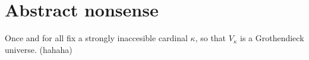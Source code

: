 \chapter{Abstract nonsense}\label{app:abstract-nonsense}
Once and for all fix a strongly inaccesible cardinal $\kappa$, so that $V_{\kappa}$ is a Grothendieck universe. (hahaha)